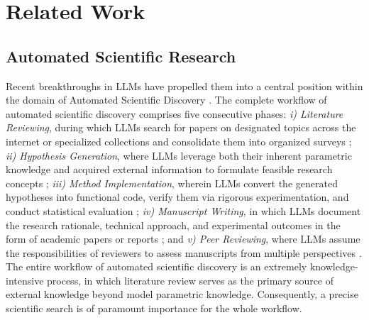 \section{Related Work}

\subsection{Automated Scientific Research}
Recent breakthroughs in LLMs \citep{reasoning-survey,long-cot-survey} have propelled them into a central position within the domain of Automated Scientific Discovery \citep{dsgym,agent-laboratory,ai-scientist,how-far-ai-sci,datamind}.
The complete workflow of automated scientific discovery comprises five consecutive phases: \textit{i) Literature Reviewing}, during which LLMs search for papers on designated topics across the internet or specialized collections and consolidate them into organized surveys \citep{autosurvey,surveyx,opensholar,surveyforge,litllms}; \textit{ii) Hypothesis Generation}, where LLMs leverage both their inherent parametric knowledge and acquired external information to formulate feasible research concepts \citep{chain-of-ideas,virsci,deep-ideation,researchagent,scipip}; \textit{iii) Method Implementation}, wherein LLMs convert the generated hypotheses into functional code, verify them via rigorous experimentation, and conduct statistical evaluation \citep{alphaevolve,automind,ml-master,alpharesearch,aide}; \textit{iv) Manuscript Writing}, in which LLMs document the research rationale, technical approach, and experimental outcomes in the form of academic papers or reports \citep{overleafcoplilot,xtragpt}; and \textit{v) Peer Reviewing}, where LLMs assume the responsibilities of reviewers to assess manuscripts from multiple perspectives \citep{cycleresearcher,agentreview,reviewer2,deepreview}.
The entire workflow of automated scientific discovery is an extremely knowledge-intensive process, in which literature review serves as the primary source of external knowledge beyond model parametric knowledge.
Consequently, a precise scientific search is of paramount importance for the whole workflow.

